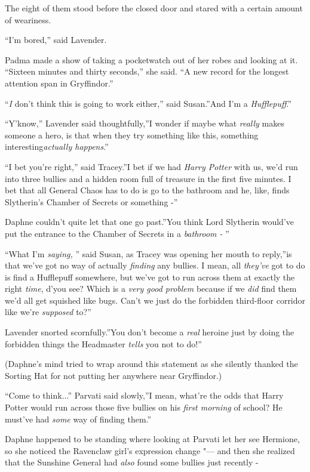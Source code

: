 The eight of them stood before the closed door and stared with a certain
amount of weariness.

``I'm bored,'' said Lavender.

Padma made a show of taking a pocketwatch out of her robes and looking
at it. ``Sixteen minutes and thirty seconds,'' she said. ``A new record
for the longest attention span in Gryffindor.''

``\emph{I} don't think this is going to work either,'' said Susan.''And
I'm a \emph{Hufflepuff}.''

``Y'know,'' Lavender said thoughtfully,''I wonder if maybe what
\emph{really} makes someone a hero, is that when they try something like
this, something interesting\emph{actually happens}.''

``I bet you're right,'' said Tracey.''I bet if we had \emph{Harry
Potter} with us, we'd run into three bullies and a hidden room full of
treasure in the first five minutes. I bet that all General Chaos has to
do is go to the bathroom and he, like, finds Slytherin's Chamber of
Secrets or something -''

Daphne couldn't quite let that one go past.''You think Lord Slytherin
would've put the entrance to the Chamber of Secrets in a \emph{bathroom
-} ''

``What I'm \emph{saying,} '' said Susan, as Tracey was opening her mouth
to reply,''is that we've got no way of actually \emph{finding} any
bullies. I mean, all \emph{they've} got to do is find a Hufflepuff
somewhere, but we've got to run across them at exactly the right
\emph{time}, d'you see? Which is a \emph{very good problem} because if
we \emph{did} find them we'd all get squished like bugs. Can't we just
do the forbidden third-floor corridor like we're \emph{supposed} to?''

Lavender snorted scornfully.''You don't become a \emph{real} heroine
just by doing the forbidden things the Headmaster \emph{tells} you not
to do!''

(Daphne's mind tried to wrap around this statement as she silently
thanked the Sorting Hat for not putting her anywhere near Gryffindor.)

``Come to think...'' Parvati said slowly,''I mean, what're the odds
that Harry Potter would run across those five bullies on his \emph{first
morning} of school? He must've had \emph{some} way of finding them.''

Daphne happened to be standing where looking at Parvati let her see
Hermione, so she noticed the Ravenclaw girl's expression change "--- and
then she realized that the Sunshine General had \emph{also} found some
bullies just recently -


